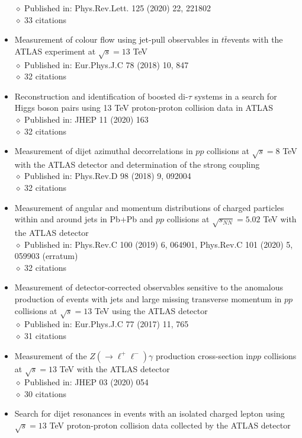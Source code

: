 \documentclass[margin, 10pt]{res} %
\begin{document}
\begin{resume}
\begin{itemize}
$\diamond$ Published in: Phys.Rev.Lett. 125 (2020) 22, 221802\\
$\diamond$ 33 citations
\item Measurement of colour flow using jet-pull observables in $t\bar{t}$events with the ATLAS experiment at $\sqrt{s} = 13$ TeV\\
$\diamond$ Published in: Eur.Phys.J.C 78 (2018) 10, 847\\
$\diamond$ 32 citations
\item Reconstruction and identification of boosted di-$\tau$ systems in a search for Higgs boson pairs using 13 TeV proton-proton collision data in ATLAS\\
$\diamond$ Published in: JHEP 11 (2020) 163\\
$\diamond$ 32 citations
\item Measurement of dijet azimuthal decorrelations in $pp$ collisions at $\sqrt{s} = 8$ TeV with the ATLAS detector and determination of the strong coupling\\
$\diamond$ Published in: Phys.Rev.D 98 (2018) 9, 092004\\
$\diamond$ 32 citations
\item Measurement of angular and momentum distributions of charged particles within and around jets in Pb+Pb and $pp$ collisions at $\sqrt{s_{NN}} = 5.02$ TeV with the ATLAS detector\\
$\diamond$ Published in: Phys.Rev.C 100 (2019) 6, 064901, Phys.Rev.C 101 (2020) 5, 059903 (erratum)\\
$\diamond$ 32 citations
\item Measurement of detector-corrected observables sensitive to the anomalous production of events with jets and large missing transverse momentum in $pp$ collisions at $\sqrt{s} = 13$ TeV using the ATLAS detector\\
$\diamond$ Published in: Eur.Phys.J.C 77 (2017) 11, 765\\
$\diamond$ 31 citations
\item Measurement of the $Z(\rightarrow \ell^{+}\ell^{-})\gamma$ production cross-section in$pp$ collisions at $\sqrt{s} = 13$ TeV with the ATLAS detector\\
$\diamond$ Published in: JHEP 03 (2020) 054\\
$\diamond$ 30 citations
\item Search for dijet resonances in events with an isolated charged lepton using $\sqrt{s} = 13$ TeV proton-proton collision data collected by the ATLAS detector\\

\end{itemize}
\end{resume}
\end{document}
